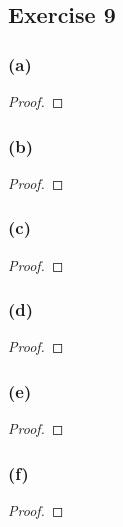 \documentclass[14pt]{extarticle}
\begin{document}
\subsection{Exercise 9}

\subsubsection{(a)}

\begin{proof}

\end{proof}

\subsubsection{(b)}

\begin{proof}

\end{proof}

\subsubsection{(c)}

\begin{proof}

\end{proof}

\subsubsection{(d)}

\begin{proof}

\end{proof}

\subsubsection{(e)}

\begin{proof}

\end{proof}

\subsubsection{(f)}

\begin{proof}

\end{proof}
\end{document}
